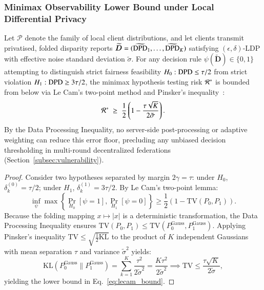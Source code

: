 \subsubsection{Minimax Observability Lower Bound under Local Differential Privacy}
\label{subsubsec:theory_minimax}
\begin{theorem}
\label{thm:minimax_lecam}
Let $\mathcal{P}$ denote the family of local client distributions, and let clients transmit privatised, folded disparity reports $\widetilde{\bm{D}} = (\widetilde{\mathrm{DPD}}_1, \dots, \widetilde{\mathrm{DPD}}_K)$ satisfying $(\epsilon, \delta)$-LDP with effective noise standard deviation $\tilde{\sigma}$. For any decision rule $\psi(\widetilde{\bm{D}}) \in \{0, 1\}$ attempting to distinguish strict fairness feasibility $H_0: \mathrm{DPD} \le \tau/2$ from strict violation $H_1: \mathrm{DPD} \ge 3\tau/2$, the minimax hypothesis testing risk $\mathcal{R}^*$ is bounded from below via Le Cam's two-point method and Pinsker's inequality~\citep{lecam1973convergence, tsybakov2009nonparametric}:
\begin{equation}
\label{eq:lecam_bound}
\mathcal{R}^* \;\ge\; \frac{1}{2} \left( 1 - \frac{\tau \sqrt{K}}{2 \tilde{\sigma}} \right).
\end{equation}
By the Data Processing Inequality, no server-side post-processing or adaptive weighting can reduce this error floor, precluding any unbiased decision thresholding in multi-round decentralized federations (Section~\ref{subsec:vulnerability}).
\end{theorem}
\begin{proof}
Consider two hypotheses separated by margin $2\gamma = \tau$: under $H_0$, $\delta_k^{(0)} = \tau/2$; under $H_1$, $\delta_k^{(1)} = 3\tau/2$. By Le Cam's two-point lemma:
\begin{equation*}
\inf_\psi \max\left\{ \Pr_{H_0}[\psi=1], \Pr_{H_1}[\psi=0] \right\} \ge \frac{1}{2}\left( 1 - \mathrm{TV}(P_0, P_1) \right).
\end{equation*}
Because the folding mapping $x \mapsto |x|$ is a deterministic transformation, the Data Processing Inequality ensures $\mathrm{TV}(P_0, P_1) \le \mathrm{TV}(P_0^{\mathrm{Gauss}}, P_1^{\mathrm{Gauss}})$. Applying Pinsker's inequality $\mathrm{TV} \le \sqrt{\frac{1}{2}\mathrm{KL}}$ to the product of $K$ independent Gaussians with mean separation $\tau$ and variance $\tilde{\sigma}^2$ yields:
\begin{equation*}
\mathrm{KL}(P_0^{\mathrm{Gauss}} \parallel P_1^{\mathrm{Gauss}}) = \sum_{k=1}^K \frac{\tau^2}{2\tilde{\sigma}^2} = \frac{K\tau^2}{2\tilde{\sigma}^2} \implies \mathrm{TV} \le \frac{\tau\sqrt{K}}{2\tilde{\sigma}},
\end{equation*}
yielding the lower bound in Eq.~\eqref{eq:lecam_bound}.
\end{proof}

